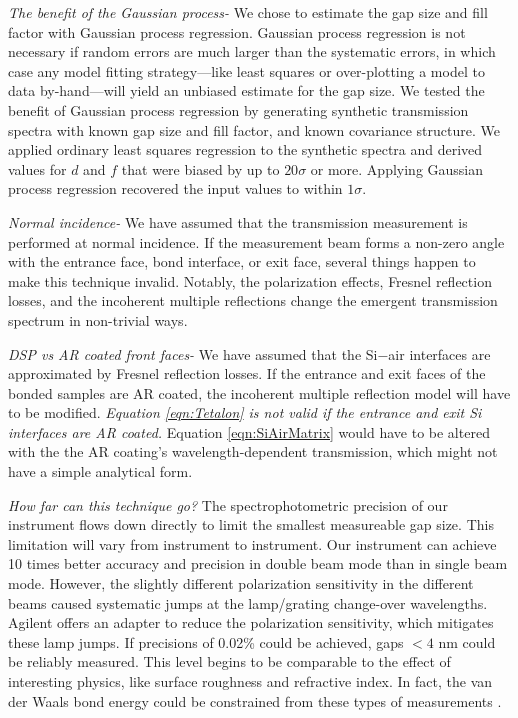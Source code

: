\documentclass[osajnl,preprint,showpacs,superscriptaddress,12pt]{revtex4-1} %
\begin{document}
\emph{The benefit of the Gaussian process-} We chose to estimate the gap size and fill factor with Gaussian process regression.  Gaussian process regression is not necessary if random errors are much larger than the systematic errors, in which case any model fitting strategy---like least squares or over-plotting a model to data by-hand---will yield an unbiased estimate for the gap size.  We tested the benefit of Gaussian process regression by generating synthetic transmission spectra with known gap size and fill factor, and known covariance structure.  We applied ordinary least squares regression to the synthetic spectra and derived values for $d$ and $f$ that were biased by up to $20\sigma$ or more.  Applying Gaussian process regression recovered the input values to within $1\sigma$.  

\emph{Normal incidence- } We have assumed that the transmission measurement is performed at normal incidence.  If the measurement beam forms a non-zero angle with the entrance face, bond interface, or exit face, several things happen to make this technique invalid.  Notably, the polarization effects, Fresnel reflection losses, and the incoherent multiple reflections change the emergent transmission spectrum in non-trivial ways.

\emph{DSP vs AR coated front faces- } We have assumed that the Si$-$air interfaces are approximated by Fresnel reflection losses.  If the entrance and exit faces of the bonded samples are AR coated, the incoherent multiple reflection model will have to be modified.  \emph{Equation \ref{eqn:Tetalon} is not valid if the entrance and exit Si interfaces are AR coated.}  Equation \ref{eqn:SiAirMatrix} would have to be altered with the the AR coating's wavelength-dependent transmission, which might not have a simple analytical form.

\emph{How far can this technique go?}  The spectrophotometric precision of our instrument flows down directly to limit the smallest measureable gap size.  This limitation will vary from instrument to instrument.  Our instrument can achieve 10 times better accuracy and precision in double beam mode than in single beam mode.  However, the slightly different polarization sensitivity in the different beams caused systematic jumps at the lamp/grating change-over wavelengths.  Agilent offers an adapter to reduce the polarization sensitivity, which mitigates these lamp jumps.  If precisions of 0.02\% could be achieved, gaps $<4$ nm could be reliably measured.  This level begins to be comparable to the effect of interesting physics, like surface roughness and refractive index.  In fact, the van der Waals bond energy could be constrained from these types of measurements \cite{2001JOptA...3...85G}.
\end{document}
